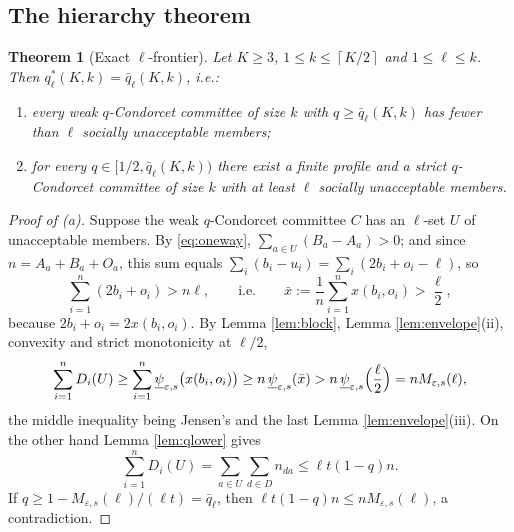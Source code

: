 \documentclass[11pt]{article}
\theoremstyle{plain}
\newtheorem{theorem}{Theorem}
\theoremstyle{definition}
\newcommand{\cl}[1]{\left\lceil #1\right\rceil}
\newcommand{\eps}{\varepsilon}
\newcommand{\uw}{\underline{\psi}}
\begin{document}
\subsection{The hierarchy theorem}

\begin{theorem}[Exact $\ell$-frontier]
\label{thm:hierarchy}
Let $K\ge3$, $1\le k\le\cl{K/2}$ and $1\le\ell\le k$. Then $q_\ell^*(K,k)=\bar q_\ell(K,k)$, i.e.:
\begin{enumerate}[label=(\alph*)]
\item every weak $q$-Condorcet committee of size $k$ with $q\ge\bar q_\ell(K,k)$ has fewer than $\ell$ socially unacceptable members;
\item for every $q\in[1/2,\bar q_\ell(K,k))$ there exist a finite profile and a strict $q$-Condorcet committee of size $k$ with at least $\ell$ socially unacceptable members.
\end{enumerate}
\end{theorem}

\begin{proof}[Proof of (a)]
Suppose the weak $q$-Condorcet committee $C$ has an $\ell$-set $U$ of unacceptable members. By \eqref{eq:oneway}, $\sum_{a\in U}(B_a-A_a)>0$; and since $n=A_a+B_a+O_a$, this sum equals $\sum_i(b_i-u_i)=\sum_i(2b_i+o_i-\ell)$, so
\[
\sum_{i=1}^n(2b_i+o_i)>n\ell,\qquad\text{i.e.}\qquad \bar x:=\frac1n\sum_{i=1}^n x(b_i,o_i)>\frac{\ell}{2},
\]
because $2b_i+o_i=2x(b_i,o_i)$. By Lemma \ref{lem:block}, Lemma \ref{lem:envelope}(ii), convexity and strict monotonicity at $\ell/2$,
\[
\sum_{i=1}^n D_i(U)\ge\sum_{i=1}^n\uw_{\eps,s}\bigl(x(b_i,o_i)\bigr)\ge n\,\uw_{\eps,s}(\bar x)>n\,\uw_{\eps,s}\Bigl(\frac{\ell}{2}\Bigr)=nM_{\eps,s}(\ell),
\]
the middle inequality being Jensen's and the last Lemma \ref{lem:envelope}(iii). On the other hand Lemma \ref{lem:qlower} gives
\[
\sum_{i=1}^n D_i(U)=\sum_{a\in U}\sum_{d\in D}n_{da}\le \ell t(1-q)n .
\]
If $q\ge 1-M_{\eps,s}(\ell)/(\ell t)=\bar q_\ell$, then $\ell t(1-q)n\le nM_{\eps,s}(\ell)$, a contradiction.
\end{proof}
\end{document}

